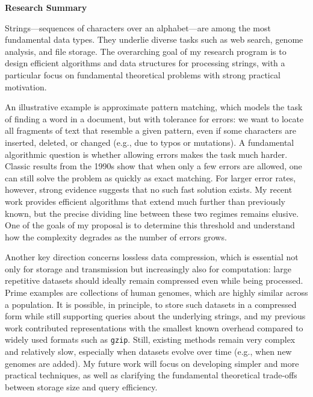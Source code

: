 \documentclass[a4paper,11pt]{article}
\begin{document}
\thispagestyle{firststyle}
\begin{center}
{\bfseries {Research Summary}}
\end{center}\vspace{-.25cm}
Strings—sequences of characters over an alphabet—are among the most fundamental data types. They underlie diverse tasks such as web search, genome analysis, and file storage. The overarching goal of my research program is to design efficient algorithms and data structures for processing strings, with a particular focus on fundamental theoretical problems with strong practical motivation.

An illustrative example is approximate pattern matching, which models the task of finding a word in a document, but with tolerance for errors: we want to locate all fragments of text that resemble a given pattern, even if some characters are inserted, deleted, or changed (e.g., due to typos or mutations). A fundamental algorithmic question is whether allowing errors makes the task much harder. Classic results from the 1990s show that when only a few errors are allowed, one can still solve the problem as quickly as exact matching. For larger error rates, however, strong evidence suggests that no such fast solution exists. My recent work provides efficient algorithms that extend much further than previously known, but the precise dividing line between these two regimes remains elusive. One of the goals of my proposal is to determine this threshold and understand how the complexity degrades as the number of errors grows.

Another key direction concerns lossless data compression, which is essential not only for storage and transmission but increasingly also for computation: large repetitive datasets should ideally remain compressed even while being processed. Prime examples are collections of human genomes, which are highly similar across a population. It is possible, in principle, to store such datasets in a compressed form while still supporting queries about the underlying strings, and my previous work contributed representations with the smallest known overhead compared to widely used formats such as \texttt{gzip}. Still, existing methods remain very complex and relatively slow, especially when datasets evolve over time (e.g., when new genomes are added). My future work will focus on developing simpler and more practical techniques, as well as clarifying the fundamental theoretical trade-offs between storage size and query efficiency.
\end{document}
